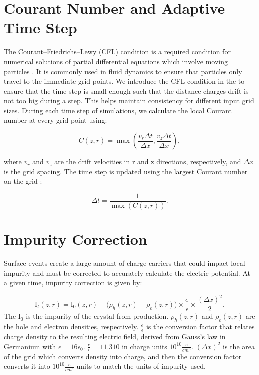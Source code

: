 \section{Courant Number and Adaptive Time Step}

The Courant–Friedrichs–Lewy (CFL) condition is a required condition for numerical solutions of partial differential equations which involve moving particles \cite{cfl_condition}. It is commonly used in fluid dynamics to ensure that particles only travel to the immediate grid points. We introduce the CFL condition in the {\ehd} to ensure that the time step is small enough such that the distance charges drift is not too big during a step. This helps maintain consistency for different input grid sizes. During each time step of simulations, we calculate the local Courant number at every grid point using:

\begin{equation}
C(z,r) = \max \left( \frac{v_r \Delta t}{\Delta x}, \frac{v_z \Delta t}{\Delta x} \right),
\end{equation}

where \( v_r \) and \( v_z \) are the drift velocities in r and z directions, respectively, and  \( \Delta x \) is the grid spacing. The time step is updated using the largest Courant number on the grid :

\begin{equation}
\Delta t = \frac{1}{\max (C(z,r))}.
\end{equation}



\section{Impurity Correction}
Surface events create a large amount of charge carriers that could impact local impurity and must be corrected to accurately calculate the electric potential. At a given time, impurity correction is given by:

\begin{equation}
  {\text{I}_{t}}(z, r) = \text{I}_{0}(z, r) +
  \bigl( \rho_h(z, r) - \rho_e(z, r) \bigr) \times \frac{e}{\epsilon} \times \frac{(\Delta x)^2}{2}.
\end{equation}
The $\text{I}_{0}$ is the impurity of the crystal from production. $\rho_h(z,r)$ and $\rho_e(z,r)$ are the hole and electron densities, respectively. $\frac{e}{\epsilon}$ is the conversion factor that relates charge density to the resulting electric field, derived from Gauss’s law in Germanium with $\epsilon = 16\epsilon_0$. $\frac{e}{\epsilon} = 11.310$ in 
charge units $10^{10}\frac{e}{cm^3}$. $(\Delta x)^2$ is the area of the grid which converts density into charge, and then the conversion factor converts it into $10^{10}\frac{e}{cm^3}$ units to match the units of impurity used.

